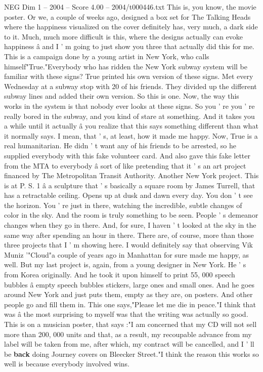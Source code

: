 \begin{textsample}{NEG Dim 1 – 2004 – Score 4.00 – 2004/t000446.txt}
This is, you know, the movie poster.
Or we, a couple of weeks ago, designed a box set for The Talking Heads where the happiness visualized on the cover definitely has, very much, a dark side to it.
Much, much more difficult is this, where the designs actually can evoke happiness â and I ' m going to just show you three that actually did this for me.
This is a campaign done by a young artist in New York, who calls himself"True."Everybody who has ridden the New York subway system will be familiar with these signs?
True printed his own version of these signs.
Met every Wednesday at a subway stop with 20 of his friends.
They divided up the different subway lines and added their own version.
So this is one.
Now, the way this works in the system is that nobody ever looks at these signs.
So you ' re you ' re really bored in the subway, and you kind of stare at something.
And it takes you a while until it actually â you realize that this says something different than what it normally says.
I mean, that ' s, at least, how it made me happy.
Now, True is a real humanitarian.
He didn ' t want any of his friends to be arrested, so he supplied everybody with this fake volunteer card.
And also gave this fake letter from the MTA to everybody â sort of like pretending that it ' s an art project financed by The Metropolitan Transit Authority.
Another New York project.
This is at P.
S. 1 â a sculpture that ' s basically a square room by James Turrell, that has a retractable ceiling.
Opens up at dusk and dawn every day.
You don ' t see the horizon.
You ' re just in there, watching the incredible, subtle changes of color in the sky.
And the room is truly something to be seen.
People ' s demeanor changes when they go in there.
And, for sure, I haven ' t looked at the sky in the same way after spending an hour in there.
There are, of course, more than those three projects that I ' m showing here.
I would definitely say that observing Vik Muniz '"Cloud"a couple of years ago in Manhattan for sure made me happy, as well.
But my last project is, again, from a young designer in New York.
He ' s from Korea originally.
And he took it upon himself to print 55, 000 speech bubbles â empty speech bubbles stickers, large ones and small ones.
And he goes around New York and just puts them, empty as they are, on posters.
And other people go and fill them in.
This one says,"Please let me die in peace."I think that was â the most surprising to myself was that the writing was actually so good.
This is on a musician poster, that says :"I am concerned that my CD will not sell more than 200, 000 units and that, as a result, my recoupable advance from my label will be taken from me, after which, my contract will be cancelled, and I ' ll be \textbf{back} doing Journey covers on Bleecker Street."I think the reason this works so well is because everybody involved wins.

\end{textsample}
